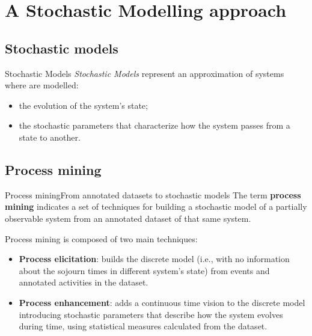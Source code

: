 \documentclass[9pt, handout]{beamer}
\begin{document}
  \section{A Stochastic Modelling approach}
    \subsection{Stochastic models}
      \begin{frame}{Stochastic Models}
        \pause
        \textit{Stochastic Models} represent an approximation of systems where are modelled:
        \pause
        \begin{itemize}
          \item the evolution of the system's state;
          \pause
          \item the stochastic parameters that characterize how the system passes from a state to another.
        \end{itemize}
        \pause
      \end{frame}
    
    \subsection{Process mining}
      \begin{frame}{Process mining}{From annotated datasets to stochastic models}
        \pause
        The term \textbf{process mining} indicates a set of techniques for building a stochastic model of a partially observable system from an annotated dataset of that same system.
        
        \pause
        \vspace{1em}
        Process mining is composed of two main techniques:
        \pause
        \begin{itemize}
          \item \textbf{Process elicitation}: builds the discrete model (i.e., with no information about the sojourn times in different system's state) from events and annotated activities in the dataset.
          \pause
          \item \textbf{Process enhancement}: adds a continuous time vision to the discrete model introducing stochastic parameters that describe how the system evolves during time, using statistical measures calculated from the dataset.
        \end{itemize}
      \end{frame}
      
\end{document}
